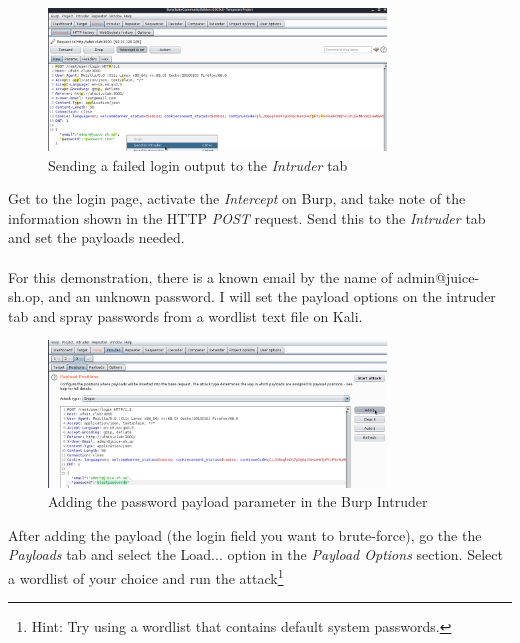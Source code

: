 \documentclass[a4paper,11pt]{article}
\renewcommand{\tt}[2][tt]{\textcolor{#1}{\ttfamily #2}}%
\begin{document}
\begin{figure}[h]
    \centering
    \includegraphics[width=0.8\textwidth]{images/sample-burp-intruder.png}
    \caption{Sending a failed login output to the \textit{Intruder} tab}
    \label{sample-burp-intruder}
\end{figure}

Get to the login page, activate the \textit{Intercept} on Burp, and take note of the information shown in the HTTP \textit{POST} request. Send this to the \textit{Intruder} tab and set the payloads needed.
\\
\\
For this demonstration, there is a known email by the name of \tt{admin@juice-sh.op}, and an unknown password. I will set the payload options on the intruder tab and spray passwords from a wordlist text file on Kali.

\begin{figure}[h]
    \centering
    \includegraphics[width=0.8\textwidth]{images/sample-burp-payload1.png}
    \caption{Adding the password payload parameter in the Burp Intruder}
    \label{fig:sample-burp-payload1}
\end{figure}

After adding the payload (the login field you want to brute-force), go the the \textit{Payloads} tab and select the \tt{Load...} option in the \textit{Payload Options} section. Select a wordlist of your choice and run the attack\footnote[2]{Hint: Try using a wordlist that contains default system passwords.}
\pagebreak
\end{document}
